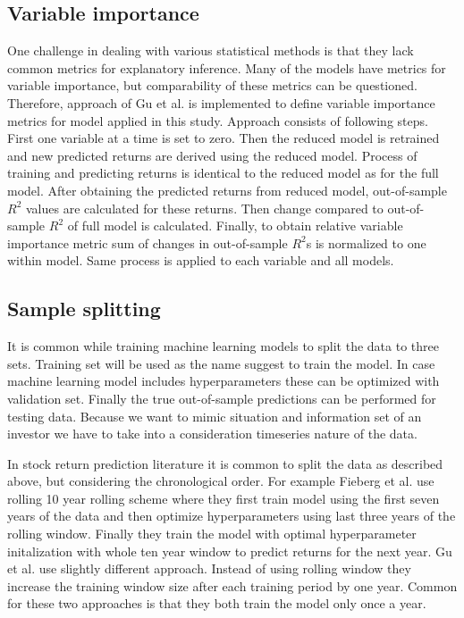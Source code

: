 \documentclass{article}
\begin{document}
\subsection{Variable importance} \label{VariableImportance}

One challenge in dealing with various statistical methods is that they lack common metrics for explanatory inference. Many of the models have metrics for variable importance, but comparability of these metrics can be questioned. Therefore, approach of Gu et al. \citeyear{guetal} is implemented to define variable importance metrics for model applied in this study. Approach consists of following steps. First one variable at a time is set to zero. Then the reduced model is retrained and new predicted returns are derived using the reduced model. Process of training and predicting returns is identical to the reduced model as for the full model. After obtaining the predicted returns from reduced model, out-of-sample $R^2$ values are calculated for these returns. Then change compared to out-of-sample $R^2$ of full model is calculated. Finally, to obtain relative variable importance metric sum of changes in out-of-sample $R^2$s is normalized to one within model. Same process is applied to each variable and all models.

\subsection{Sample splitting} \label{SampleSplitting}

It is common while training machine learning models to split the data to three sets. Training set will be used as the name suggest to train the model. In case machine learning model includes hyperparameters these can be optimized with validation set. Finally the true out-of-sample predictions can be performed for testing data. Because we want to mimic situation and information set of an investor we have to take into a consideration timeseries nature of the data. 

In stock return prediction literature it is common to split the data as described above, but considering the chronological order. For example Fieberg et al. \citeyear{Fieberg} use rolling 10 year rolling scheme where they first train model using the first seven years of the data and then optimize hyperparameters using last three years of the rolling window. Finally they train the model with optimal hyperparameter initalization with whole ten year window to predict returns for the next year. Gu et al. \citeyear{guetal} use slightly different approach. Instead of using rolling window they increase the training window size after each training period by one year. Common for these two approaches is that they both train the model only once a year.
\end{document}
